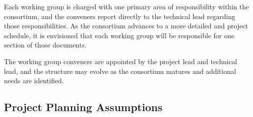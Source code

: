 Each working group is charged with one primary area of responsibility within the consortium, and the conveners report directly to the technical lead regarding those responsibilities.  As the consortium advances to a more detailed  and project schedule, it is envisioned that each working group will be responsible for one section of those documents.

The working group conveners are appointed by the  project lead and technical lead, and the structure may evolve as the consortium matures and additional needs are identified. 

\subsection{Project Planning Assumptions}
\label{sec:fdsp-pd-org-assmp}





